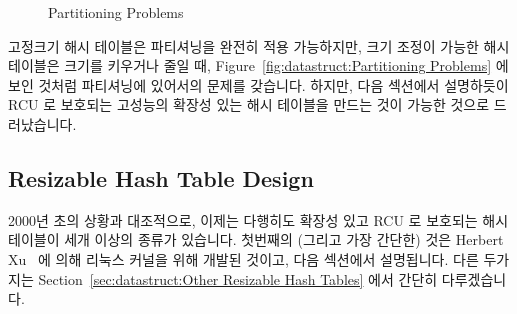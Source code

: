 \begin{figure}[tb]
\centering
{}
\caption{Partitioning Problems}
\end{figure}

고정크기 해시 테이블은 파티셔닝을 완전히 적용 가능하지만, 크기 조정이 가능한
해시 테이블은 크기를 키우거나 줄일 때,
Figure~\ref{fig:datastruct:Partitioning Problems} 에 보인 것처럼 파티셔닝에
있어서의 문제를 갖습니다.
하지만, 다음 섹션에서 설명하듯이 RCU 로 보호되는 고성능의 확장성 있는 해시
테이블을 만드는 것이 가능한 것으로 드러났습니다.

\subsection{Resizable Hash Table Design}
\label{sec:datastruct:Resizable Hash Table Design}

2000년 초의 상황과 대조적으로, 이제는 다행히도 확장성 있고 RCU 로 보호되는
해시 테이블이 세개 이상의 종류가 있습니다.
첫번째의 (그리고 가장 간단한) 것은 Herbert Xu~\cite{HerbertXu2010RCUResizeHash}
에 의해 리눅스 커널을 위해 개발된 것이고, 다음 섹션에서 설명됩니다.
다른 두가지는
Section~\ref{sec:datastruct:Other Resizable Hash Tables} 에서
간단히 다루겠습니다.
\iffalse


